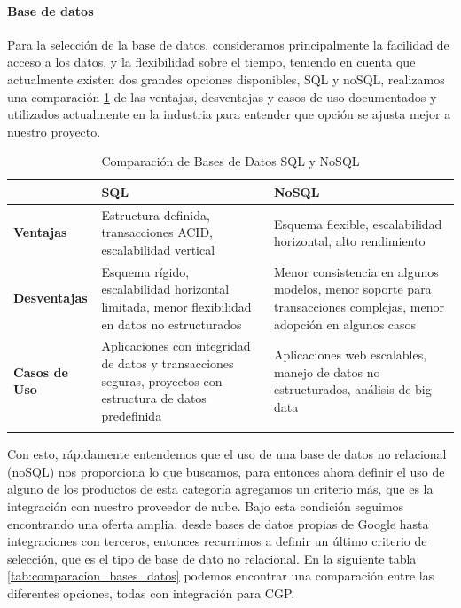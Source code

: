 \paragraph{Base de datos}
%
Para la selección de la base de datos, consideramos principalmente la facilidad de acceso a los datos, y la flexibilidad sobre el tiempo, teniendo en cuenta que actualmente existen dos grandes opciones disponibles, SQL y noSQL, realizamos una comparación \ref{tab:comparacion_bd_sql_nosql} de las ventajas, desventajas y casos de uso documentados y utilizados actualmente en la industria para entender que opción se ajusta mejor a nuestro proyecto.\\
%
\begin{longtable}{|m{3cm}|m{5cm}|m{5cm}|}
\hline
\textbf{} & \textbf{SQL} & \textbf{NoSQL} \\
\hline
\textbf{Ventajas} & Estructura definida, transacciones ACID, escalabilidad vertical & Esquema flexible, escalabilidad horizontal, alto rendimiento \\
\hline
\textbf{Desventajas} & Esquema rígido, escalabilidad horizontal limitada, menor flexibilidad en datos no estructurados & Menor consistencia en algunos modelos, menor soporte para transacciones complejas, menor adopción en algunos casos \\
\hline
\textbf{Casos de Uso} & Aplicaciones con integridad de datos y transacciones seguras, proyectos con estructura de datos predefinida & Aplicaciones web escalables, manejo de datos no estructurados, análisis de big data \\
\hline
\caption{Comparación de Bases de Datos SQL y NoSQL}
\label{tab:comparacion_bd_sql_nosql}
\end{longtable}
%
Con esto, rápidamente entendemos que el uso de una base de datos no relacional (noSQL) nos proporciona lo que buscamos, para entonces ahora definir el uso de alguno de los productos de esta categoría agregamos un criterio más, que es la integración con nuestro proveedor de nube.
Bajo esta condición seguimos encontrando una oferta amplia, desde bases de datos propias de Google hasta integraciones con terceros, entonces recurrimos a definir un último criterio de selección, que es el tipo de base de dato no relacional. En la siguiente tabla \ref{tab:comparacion_bases_datos} podemos encontrar una comparación entre las diferentes opciones, todas con integración para CGP.\\
%
